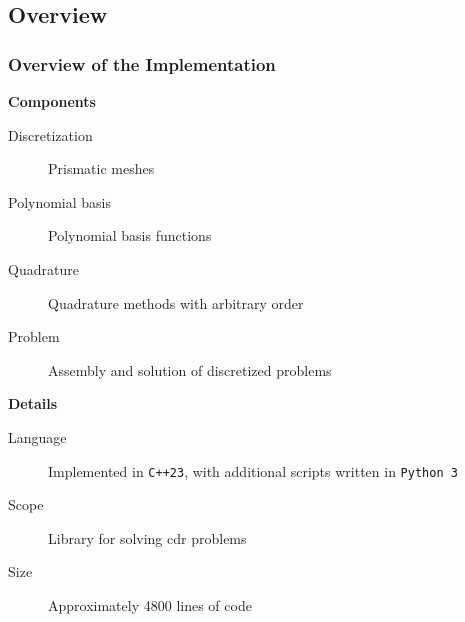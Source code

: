\subsection{Overview}

\begin{frame}
    \frametitle{Overview of the Implementation}

    \begin{multicols}{2}

        \begin{center}
            {\color{\accentcolor} \Large \textbf{Components}}
            \vspace*{0.5cm}

            \begin{minipage}{0.4\textwidth}
                \begin{description}
                    \item[Discretization] Prismatic meshes
                    \item[Polynomial basis] Polynomial basis functions
                    \item[Quadrature] Quadrature methods with arbitrary order
                    \item[Problem] Assembly and solution of discretized problems
                \end{description}
            \end{minipage}
        \end{center}

        \vfill\null
        \columnbreak

        \begin{center}
            {\color{\accentcolor} \Large \textbf{Details}}
            \vspace*{0.5cm}

            \begin{minipage}{0.4\textwidth}
                \begin{description}
                    \item[Language] Implemented in \lstinline{C++23}, with additional scripts written in \lstinline{Python 3}
                    \item[Scope] Library for solving \acrshort{cdr} problems
                    \item[Size] Approximately 4800 lines of code
                \end{description}
            \end{minipage}
        \end{center}
    \end{multicols}
    
\end{frame}

